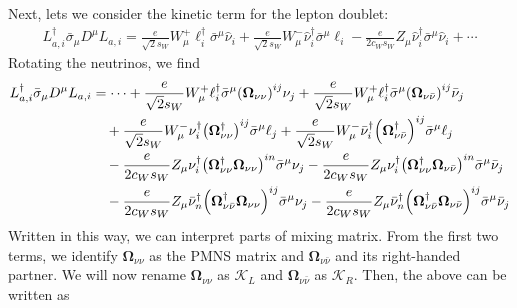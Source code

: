 \documentclass[a4paper,11pt]{article} \pdfoutput=1
\newcommand{\rhn}{\bar{\nu}}
\newcommand{\cK}{\mathcal{K}}
\newcommand{\OmegaVVb}{\bm{\Omega}_{\nu\nu}}
\newcommand{\OmegaVNb}{\bm{\Omega}_{\nu\rhn}}
\newcommand{\OmegaNVb}{\bm{\Omega}_{\rhn\nu}}
\newcommand{\OmegaNNb}{\bm{\Omega}_{\rhn\rhn}}
\begin{document}
Next, lets we consider the kinetic term for the lepton doublet:
\begin{align}
	L^{\dagger}_{a,i}\bar{\sigma}_{\mu}D^{\mu}L_{a,i} =
	\frac{e}{\sqrt{2}s_{W}}W^{+}_{\mu}\ell_{i}^{\dagger}\bar{\sigma}^{\mu}\hat{\nu}_{i}
	+\frac{e}{\sqrt{2}s_{W}}W^{-}_{\mu}\hat{\nu}_{i}^{\dagger}\bar{\sigma}^{\mu}\ell_{i}
	-\frac{e}{2c_{W}s_{W}}Z_{\mu}\hat{\nu}_{i}^{\dagger}\bar{\sigma}^{\mu}\hat{\nu}_{i} + \cdots
\end{align}
Rotating the neutrinos, we find
\begin{align}
	L^{\dagger}_{a,i}\bar{\sigma}_{\mu}D^{\mu}L_{a,i}
	 & = \cdots
	+\frac{e}{\sqrt{2}s_{W}}W^{+}_{\mu}\ell_{i}^{\dagger}\bar{\sigma}^{\mu}
	\qty(\OmegaVVb)^{ij}\nu_{j}
	+\frac{e}{\sqrt{2}s_{W}}W^{+}_{\mu}\ell_{i}^{\dagger}\bar{\sigma}^{\mu}
	\qty(\OmegaVNb)^{ij}\rhn_{j}\notag                                                                                    \\
	 & \quad
	+\frac{e}{\sqrt{2}s_{W}}W^{-}_{\mu}\nu_{i}^{\dagger}
	\qty(\OmegaVVb^{\dagger})^{ij}\bar{\sigma}^{\mu}\ell_{j}
	+\frac{e}{\sqrt{2}s_{W}}W^{-}_{\mu}\rhn_{i}^{\dagger}
	\qty(\OmegaVNb^{\dagger})^{ij}\bar{\sigma}^{\mu}\ell_{j}\notag                                                        \\
	 & \quad
	-\frac{e}{2c_{W}s_{W}}Z_{\mu}\nu_{i}^{\dagger}\qty(\OmegaVVb^{\dagger}\OmegaVVb)^{in}\bar{\sigma}^{\mu}\nu_{j}
	-\frac{e}{2c_{W}s_{W}}Z_{\mu}\nu_{i}^{\dagger}\qty(\OmegaVVb^{\dagger}\OmegaVNb)^{in}\bar{\sigma}^{\mu}\rhn_{j}\notag \\
	 & \quad
	-\frac{e}{2c_{W}s_{W}}Z_{\mu}\rhn_{n}^{\dagger}\qty(\OmegaVNb^{\dagger}\OmegaVVb)^{ij}\bar{\sigma}^{\mu}\nu_{j}
	-\frac{e}{2c_{W}s_{W}}Z_{\mu}\rhn_{n}^{\dagger}\qty(\OmegaVNb^{\dagger}\OmegaVNb)^{ij}\bar{\sigma}^{\mu}\rhn_{j}\notag
\end{align}
Written in this way, we can interpret parts of mixing matrix. From the first two terms, we identify
\(\OmegaVVb\) as the PMNS matrix and
\(\OmegaVNb\) and its right-handed partner. We will now rename
\(\OmegaVVb\) as \(\bm{\cK}_{L}\) and
\(\OmegaVNb\) as \(\bm{\cK}_{R}\). Then, the above can be
written as
\end{document}
